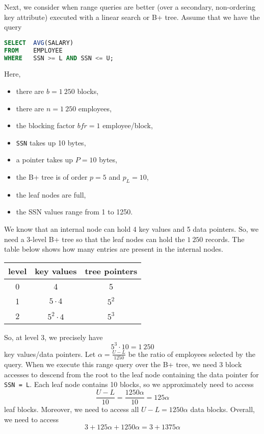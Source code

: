 \documentclass[a4paper, openany]{memoir}
\begin{document}
Next, we consider when range queries are better (over a secondary, non-ordering key attribute) executed with a linear search or B+ tree. Assume that we have the query
\begin{lstlisting}[language=SQL]
SELECT  AVG(SALARY) 
FROM    EMPLOYEE 
WHERE   SSN >= L AND SSN <= U;
\end{lstlisting}
Here,
\begin{itemize}
    \item there are $b = 1 \ 250$ blocks,
    \item there are $n = 1 \ 250$ employees,
    \item the blocking factor $\textit{bfr} = 1$ employee/block,
    \item \texttt{SSN} takes up 10 bytes,
    \item a pointer takes up $P = 10$ bytes,
    \item the B+ tree is of order $p = 5$ and $p_L = 10$,
    \item the leaf nodes are full,
    \item the SSN values range from 1 to 1250.
\end{itemize}
We know that an internal node can hold 4 key values and 5 data pointers. So, we need a 3-level B+ tree so that the leaf nodes can hold the $1 \ 250$ records. The table below shows how many entries are present in the internal nodes.
\begin{table}[H]
    \centering
    \begin{tabular}{|c|c|c|}
        \hline
        level & key values & tree pointers \\
        \hline
        0 & 4 & 5 \\
        1 & $5 \cdot 4$ & $5^2$ \\
        2 & $5^2 \cdot 4$ & $5^3$ \\
        \hline
    \end{tabular}
\end{table}
\noindent So, at level 3, we precisely have
\[5^3 \cdot 10 = 1 \ 250\]
key values/data pointers. Let $\alpha = \frac{U - L}{1250}$ be the ratio of employees selected by the query. When we execute this range query over the B+ tree, we need 3 block accesses to descend from the root to the leaf node containing the data pointer for \texttt{SSN = L}. Each leaf node contains 10 blocks, so we approximately need to access 
\[\frac{U - L}{10} = \frac{1250 \alpha}{10} = 125 \alpha\]
leaf blocks. Moreover, we need to access all $U - L = 1250 \alpha$ data blocks. Overall, we need to access
\[3 + 125 \alpha + 1250 \alpha = 3 + 1375 \alpha\]
\end{document}
